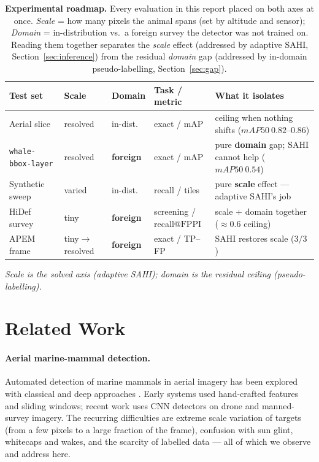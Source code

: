 \documentclass[11pt,a4paper]{article}
\newcommand{\map}{mAP}
\newcommand{\fppi}{\text{FPPI}}
\begin{document}
\begin{table}[ht]
\centering
\caption{\textbf{Experimental roadmap.} Every evaluation in this report placed on
both axes at once. \emph{Scale} = how many pixels the animal spans (set by
altitude and sensor); \emph{Domain} = in-distribution vs.\ a foreign survey the
detector was not trained on. Reading them together separates the \emph{scale}
effect (addressed by adaptive SAHI, Section~\ref{sec:inference}) from the residual
\emph{domain} gap (addressed by in-domain pseudo-labelling, Section~\ref{sec:gap}).}
\label{tab:roadmap}
\footnotesize
\setlength{\tabcolsep}{4pt}
\renewcommand{\arraystretch}{1.15}
\begin{tabular}{@{}llllp{4.2cm}@{}}
\toprule
\textbf{Test set} & \textbf{Scale} & \textbf{Domain} & \textbf{Task / metric} & \textbf{What it isolates} \\
\midrule
Aerial slice & resolved & in-dist. & exact / \map & ceiling when nothing shifts ($\map50\ 0.82$--$0.86$) \\
\texttt{whale-bbox-layer} & resolved & \textbf{foreign} & exact / \map & pure \textbf{domain} gap; SAHI cannot help ($\map50\ 0.54$) \\
Synthetic sweep & varied & in-dist. & recall / tiles & pure \textbf{scale} effect --- adaptive SAHI's job \\
HiDef survey & tiny & \textbf{foreign} & screening / recall@$\fppi$ & scale $+$ domain together ($\approx\!0.6$ ceiling) \\
APEM frame & tiny$\to$resolved & \textbf{foreign} & exact / TP--FP & SAHI restores scale ($3/3$) \\
\bottomrule
\end{tabular}

\vspace{3pt}
{\footnotesize\emph{Scale is the solved axis (adaptive SAHI); domain is the
residual ceiling (pseudo-labelling).}}
\end{table}

\section{Related Work}
\paragraph{Aerial marine-mammal detection.}
Automated detection of marine mammals in aerial imagery has been explored with
classical and deep approaches
\citep{maire2015beach,hodgson2013uav,gray2019drones,boulent2023detecting,corrigan2014aerial}.
Early systems used hand-crafted features and sliding windows; recent work uses
CNN detectors on drone and manned-survey imagery. The recurring difficulties
are extreme scale variation of targets (from a few pixels to a large fraction
of the frame), confusion with sun glint, whitecaps and wakes, and the scarcity
of labelled data --- all of which we observe and address here.
\end{document}
